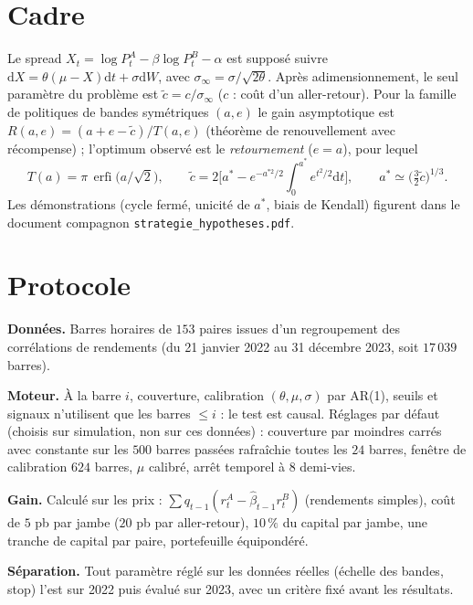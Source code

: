 \documentclass[11pt,a4paper]{article}
\theoremstyle{remark}
\newcommand{\dd}{\mathrm{d}}
\newcommand{\sinf}{\sigma_\infty}
\DeclareMathOperator{\erfi}{erfi}
\begin{document}
\section{Cadre}\label{sec:cadre}

Le spread $X_t=\log P^A_t-\beta\log P^B_t-\alpha$ est supposé suivre $\dd X=\theta(\mu-X)\dd t+\sigma\dd W$, avec $\sinf=\sigma/\sqrt{2\theta}$.
Après adimensionnement, le seul paramètre du problème est $\tilde c=c/\sinf$ ($c$ : coût d'un aller-retour). Pour la famille de politiques de bandes
symétriques $(a,e)$ le gain asymptotique est $R(a,e)=(a+e-\tilde c)/T(a,e)$ (théorème de renouvellement avec récompense) ; l'optimum observé est le
\emph{retournement} ($e=a$), pour lequel
\[
T(a)=\pi\,\erfi\!\big(a/\sqrt2\big),\qquad
\tilde c=2\Big[a^*-e^{-a^{*2}/2}\!\int_0^{a^*}\!e^{t^2/2}\dd t\Big],\qquad a^*\simeq\big(\tfrac32\tilde c\big)^{1/3}.
\]
Les démonstrations (cycle fermé, unicité de $a^*$, biais de Kendall) figurent dans le document compagnon \texttt{strategie\_hypotheses.pdf}.

\section{Protocole}\label{sec:proto}

\textbf{Données.} Barres horaires de $153$ paires issues d'un regroupement des corrélations de rendements (du 21 janvier 2022 au 31 décembre 2023, soit $17\,039$ barres).

\textbf{Moteur.} À la barre $i$, couverture, calibration $(\theta,\mu,\sigma)$ par AR(1), seuils et signaux n'utilisent que les barres $\le i$ : le test est causal.
Réglages par défaut (choisis sur simulation, non sur ces données) : couverture par moindres carrés avec constante sur les $500$ barres passées rafraîchie toutes les $24$ barres,
fenêtre de calibration $624$ barres, $\mu$ calibré, arrêt temporel à $8$ demi-vies.

\textbf{Gain.} Calculé sur les prix : $\sum q_{t-1}(r^A_t-\hat\beta_{t-1}r^B_t)$ (rendements simples), coût de $5$ pb par jambe ($20$ pb par aller-retour), $10\,\%$ du capital par jambe,
une tranche de capital par paire, portefeuille équipondéré.

\textbf{Séparation.} Tout paramètre réglé sur les données réelles (échelle des bandes, stop) l'est sur 2022 puis évalué sur 2023, avec un critère fixé avant les résultats.
\end{document}
